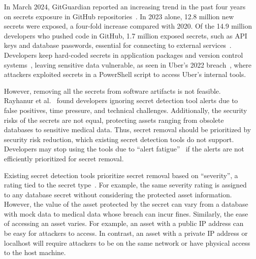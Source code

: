 In March 2024, GitGuardian reported an increasing trend in the past four years on secrets exposure in GitHub repositories~\cite{gitguardian-secret-sprawl}. In 2023 alone, 12.8 million new secrets were exposed, a four-fold increase compared with 2020. Of the 14.9 million developers who pushed code in GitHub, 1.7 million exposed secrets, such as API keys and database passwords, essential for connecting to external services~\cite{gitguardian-secret-sprawl}. Developers keep hard-coded secrets in application packages and version control systems~\cite{meli2019bad}, leaving sensitive data vulnerable, as seen in Uber's 2022 breach~\cite{uber-breach}, where attackers exploited secrets in a PowerShell script to access Uber's internal tools. 

However, removing all the secrets from software artifacts is not feasible. Rayhanur et al.~\cite{rahman2022secret} found developers ignoring secret detection tool alerts due to false positives, time pressure, and technical challenges. Additionally, the security risks of the secrets are not equal, protecting assets ranging from obsolete databases to sensitive medical data. Thus, secret removal should be prioritized by security risk reduction, which existing secret detection tools do not support. Developers may stop using the tools due to ``alert fatigue''~\cite{alert-fatigue} if the alerts are not efficiently prioritized for secret removal. 

Existing secret detection tools prioritize secret removal based on ``severity'', a rating tied to the secret type~\cite{ggshield-severity}. For example, the same severity rating is assigned to any database secret without considering the protected asset information. However, the value of the asset protected by the secret can vary from a database with mock data to medical data whose breach can incur fines. Similarly, the ease of accessing an asset varies. For example, an asset with a public IP address can be easy for attackers to access. In contrast, an asset with a private IP address or localhost will require attackers to be on the same network or have physical access to the host machine. 

